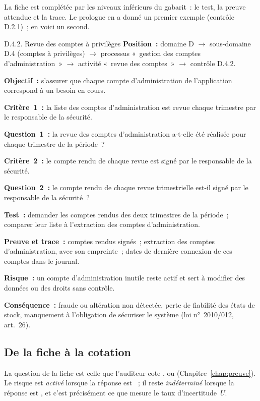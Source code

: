 La fiche est complétée par les niveaux inférieurs du gabarit~: le test,
la preuve attendue et la trace. Le prologue en a donné un premier exemple
(contrôle D.2.1)~; en voici un second.

\begin{boxobjet}{D.4.2. Revue des comptes à privilèges}
\textbf{Position~:} domaine D $\rightarrow$ sous-domaine D.4 (comptes à
privilèges) $\rightarrow$ processus «~gestion des comptes d'administration~»
$\rightarrow$ activité «~revue des comptes~» $\rightarrow$ contrôle D.4.2.

\textbf{Objectif~:} s'assurer que chaque compte d'administration de
l'application correspond à un besoin en cours.

\textbf{Critère~1~:} la liste des comptes d'administration est revue chaque
trimestre par le responsable de la sécurité.

\textbf{Question~1~:} la revue des comptes d'administration a-t-elle été
réalisée pour chaque trimestre de la période~?

\textbf{Critère~2~:} le compte rendu de chaque revue est signé par le
responsable de la sécurité.

\textbf{Question~2~:} le compte rendu de chaque revue trimestrielle est-il
signé par le responsable de la sécurité~?

\textbf{Test~:} demander les comptes rendus des deux trimestres de la
période~; comparer leur liste à l'extraction des comptes d'administration.

\textbf{Preuve et trace~:} comptes rendus signés~; extraction des comptes
d'administration, avec son empreinte~; dates de dernière connexion de ces
comptes dans le journal.

\textbf{Risque~:} un compte d'administration inutile reste actif et sert à
modifier des données ou des droits sans contrôle.

\textbf{Conséquence~:} fraude ou altération non détectée, perte de fiabilité
des états de stock, manquement à l'obligation de sécuriser le système
(loi n°~2010/012, art.~26).
\end{boxobjet}

\subsection{De la fiche à la cotation}

La question de la fiche est celle que l'auditeur cote \OUI{}, \NON{} ou
\NEK{} (Chapitre~\ref{chap:preuve}). Le risque est \emph{activé} lorsque la
réponse est \NON{}~; il reste \emph{indéterminé} lorsque la réponse est
\NEK{}, et c'est précisément ce que mesure le taux d'incertitude~$U$.

